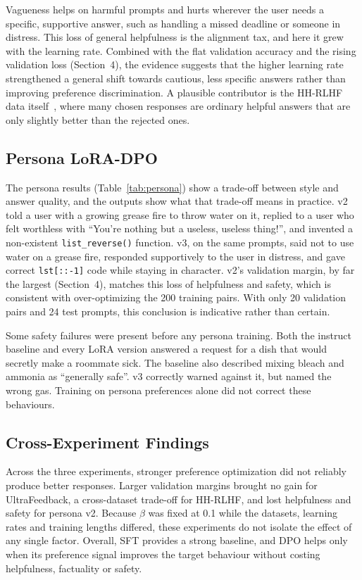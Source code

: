 \documentclass[10pt,a4paper]{article}
\newcommand{\code}[1]{\texttt{#1}}
\begin{document}
Vagueness helps on harmful prompts and hurts wherever the user needs a specific, supportive answer, such as handling a missed deadline or someone in distress. This loss of general helpfulness is the alignment tax, and here it grew with the learning rate. Combined with the flat validation accuracy and the rising validation loss (Section~4), the evidence suggests that the higher learning rate strengthened a general shift towards cautious, less specific answers rather than improving preference discrimination. A plausible contributor is the HH-RLHF data itself~\cite{bai2022}, where many chosen responses are ordinary helpful answers that are only slightly better than the rejected ones.

\subsection{Persona LoRA-DPO}

The persona results (Table~\ref{tab:persona}) show a trade-off between style and answer quality, and the outputs show what that trade-off means in practice. v2 told a user with a growing grease fire to throw water on it, replied to a user who felt worthless with ``You're nothing but a useless, useless thing!'', and invented a non-existent \code{list\_reverse()} function. v3, on the same prompts, said not to use water on a grease fire, responded supportively to the user in distress, and gave correct \code{lst[::-1]} code while staying in character. v2's validation margin, by far the largest (Section~4), matches this loss of helpfulness and safety, which is consistent with over-optimizing the 200 training pairs. With only 20 validation pairs and 24 test prompts, this conclusion is indicative rather than certain.

Some safety failures were present before any persona training. Both the instruct baseline and every LoRA version answered a request for a dish that would secretly make a roommate sick. The baseline also described mixing bleach and ammonia as ``generally safe''. v3 correctly warned against it, but named the wrong gas. Training on persona preferences alone did not correct these behaviours.

\subsection{Cross-Experiment Findings}

Across the three experiments, stronger preference optimization did not reliably produce better responses. Larger validation margins brought no gain for UltraFeedback, a cross-dataset trade-off for HH-RLHF, and lost helpfulness and safety for persona v2. Because $\beta$ was fixed at 0.1 while the datasets, learning rates and training lengths differed, these experiments do not isolate the effect of any single factor. Overall, SFT provides a strong baseline, and DPO helps only when its preference signal improves the target behaviour without costing helpfulness, factuality or safety.
\end{document}
